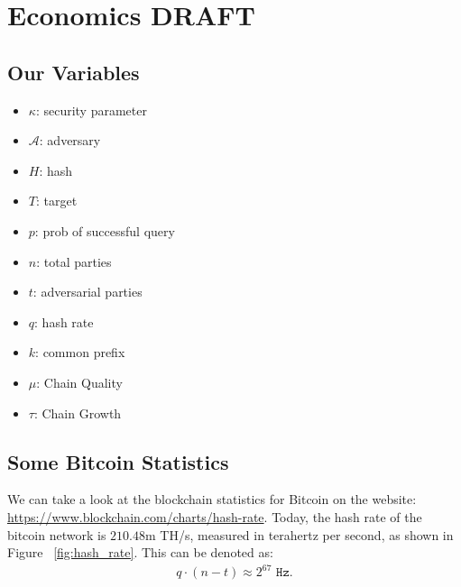 \chapter{Economics \small{\textsf{DRAFT}}}\label{chapter:economics}

\section{Our Variables}
\begin{itemize}
    \item $\kappa$: security parameter
    \item $\mathcal{A}$: adversary
    \item $H$: hash
    \item $T$: target
    \item $p$: prob of successful query
    \item $n$: total parties
    \item $t$: adversarial parties
    \item $q$: hash rate
    \item $k$: common prefix
    \item $\mu$: Chain Quality
    \item $\tau$: Chain Growth
\end{itemize}

\section{Some Bitcoin Statistics}
We can take a look at the blockchain statistics for Bitcoin on the website:\\
\href{https://www.blockchain.com/charts/hash-rate}{https://www.blockchain.com/charts/hash-rate}.
Today, the hash rate of the bitcoin network is $210.48$m TH/s, measured in terahertz per second, as shown in Figure ~\ref{fig:hash_rate}. This can be denoted as:
\begin{align*}
    q\cdot (n-t) \approx 2^{67} \texttt{ Hz}.
\end{align*}


